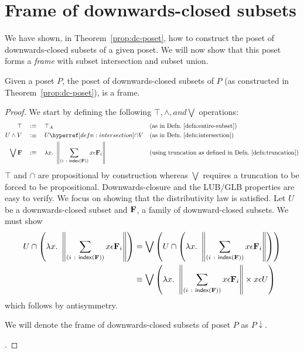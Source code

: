 \section{Frame of downwards-closed subsets}\label{sec:down-set-frame}

We have shown, in Theorem~\ref{prop:dc-poset}, how to construct the poset of
downwards-closed subsets of a given poset. We will now show that this poset forms a
\emph{frame} with subset intersection and subset union.

\begin{thm}\label{thm:down-set-frame}
  Given a poset $P$, the poset of downwards-closed subsets of $P$ (as constructed in
  Theorem~\ref{prop:dc-poset}), is a frame.
\end{thm}
\begin{proof}
  We start by defining the following $\top, \wedge, and \bigvee$ operations:
  \begin{align*}
    \top       \quad&\is\quad \top_A   && \text{(as in Defn.~\ref{defn:entire-subset})} \\
    U \wedge V   \quad&\is\quad \intersect{U}{V} && \text{(as in Defn.~\ref{defn:intersection})}\\
    \bigvee \bF{} \quad&\is\quad \lambda x.~ \trunc{\sigmaty{i}{\indexset{\bF{}}}{x \epsilon \bF{}_i}}
                         && \text{(using truncation as defined in Defn.~\ref{defn:truncation})}
  \end{align*}
  $\top$ and $\cap$ are propositional by construction whereas $\bigvee$ requires a truncation to be
  forced to be propositional. Downwards-closure and the LUB/GLB properties are easy to
  verify. We focus on showing that the distributivity law is satisfied. Let $U$ be a
  downwards-closed subset and $\mathbf{F}{}$, a family of downward-closed subsets. We must show
  \begin{align*}
    U \cap \left(\lambda x.~ \left\| \sum_{(i~:~\mathsf{index}{}\left(\mathbf{F}{}\right))} x \epsilon \mathbf{F}{}_i \right\|\right)
      &= \bigvee \left( U \cap \left( \lambda x.~ \left\| \sum_{(i~:~\mathsf{index}{}\left(\mathbf{F}{}\right))} x \epsilon \mathbf{F}{}_i \right\|\right) \right)\\
      &\equiv \bigvee \left( \lambda x.~ \left\| \sum_{(i~:~\mathsf{index}{}\left(\mathbf{F}{}\right))} x \epsilon \mathbf{F}{}_i \right\| \times x \epsilon U \right)
  \end{align*}
  which follows by antisymmetry.

  We will denote the frame of downwards-closed subsets of poset $P$ as $P\downarrow$.

  .
\end{proof}

